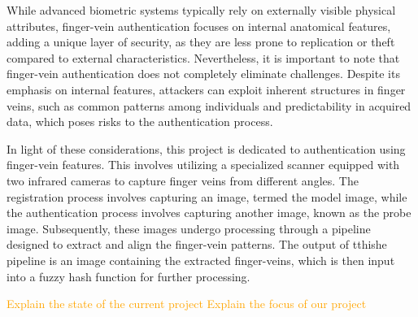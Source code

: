 While advanced biometric systems typically rely on externally visible physical attributes, finger-vein authentication focuses on internal anatomical features, adding a unique layer of security, as they are less prone to replication or theft compared to external characteristics. Nevertheless, it is important to note that finger-vein authentication does not completely eliminate challenges. Despite its emphasis on internal features, attackers can exploit inherent structures in finger veins, such as common patterns among individuals and predictability in acquired data, which poses risks to the authentication process.


In light of these considerations, this project is dedicated to authentication using finger-vein features. This involves utilizing a specialized scanner equipped with two infrared cameras to capture finger veins from different angles. The registration process involves capturing an image, termed the model image, while the authentication process involves capturing another image, known as the probe image. Subsequently, these images undergo processing through a pipeline designed to extract and align the finger-vein patterns. The output of tthishe pipeline is an image containing the extracted finger-veins, which is then input into a fuzzy hash function for further processing.\newline


\textcolor{orange}{Explain the state of the current project}\newline
\textcolor{orange}{Explain the focus of our project}\newline




